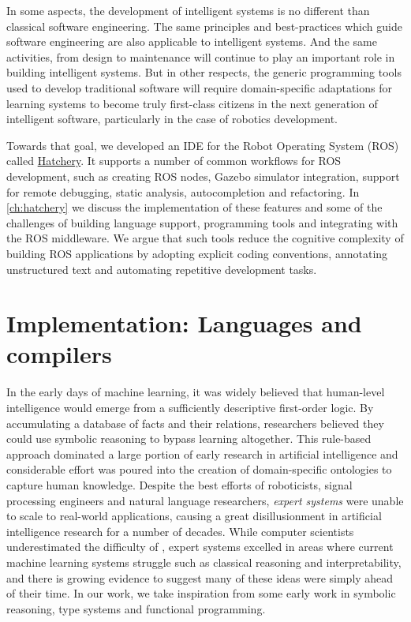 \documentclass[12pt,initial,twoside,maitrise]{dms}
\numberwithin{equation}{section}
\numberwithin{table}{chapter}
\numberwithin{figure}{chapter}
\begin{document}
In some aspects, the development of intelligent systems is no different than classical software engineering. The same principles and best-practices which guide software engineering are also applicable to intelligent systems. And the same activities, from design to maintenance will continue to play an important role in building intelligent systems. But in other respects, the generic programming tools used to develop traditional software will require domain-specific adaptations for learning systems to become truly first-class citizens in the next generation of intelligent software, particularly in the case of robotics development.

Towards that goal, we developed an IDE for the Robot Operating System (ROS) called \href{https://github.com/duckietown/hatchery}{Hatchery}. It supports a number of common workflows for ROS development, such as creating ROS nodes, Gazebo simulator integration, support for remote debugging, static analysis, autocompletion and refactoring. In \autoref{ch:hatchery} we discuss the implementation of these features and some of the challenges of building language support, programming tools and integrating with the ROS middleware. We argue that such tools reduce the cognitive complexity of building ROS applications by adopting explicit coding conventions, annotating unstructured text and automating repetitive development tasks.

\section{Implementation: Languages and compilers}

In the early days of machine learning, it was widely believed that human-level intelligence would emerge from a sufficiently descriptive first-order logic. By accumulating a database of facts and their relations, researchers believed they could use symbolic reasoning to bypass learning altogether. This rule-based approach dominated a large portion of early research in artificial intelligence and considerable effort was poured into the creation of domain-specific ontologies to capture human knowledge. Despite the best efforts of roboticists, signal processing engineers and natural language researchers, \textit{expert systems} were unable to scale to real-world applications, causing a great disillusionment in artificial intelligence research for a number of decades. While computer scientists underestimated the difficulty of , expert systems excelled in areas where current machine learning systems struggle such as classical reasoning and interpretability, and there is growing evidence to suggest many of these ideas were simply ahead of their time. In our work, we take inspiration from some early work in symbolic reasoning, type systems and functional programming.
\end{document}
